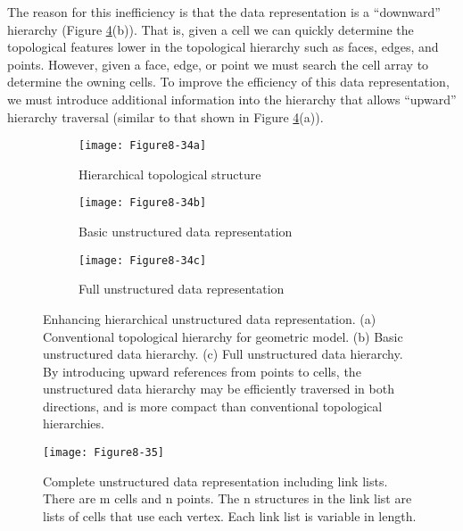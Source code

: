 The reason for this inefficiency is that the data representation is a ``downward'' hierarchy (Figure \ref{fig:Figure8-34}(b)). That is, given a cell we can quickly determine the topological features lower in the topological hierarchy such as faces, edges, and points. However, given a face, edge, or point we must search the cell array to determine the owning cells. To improve the efficiency of this data representation, we must introduce additional information into the hierarchy that allows ``upward'' hierarchy traversal (similar to that shown in Figure \ref{fig:Figure8-34}(a)).


\begin{figure}[!htb]
    \centering
    \begin{subfigure}{0.32\linewidth}
        \centering
        \texttt{[image: Figure8-34a]}
        \caption{Hierarchical topological
        structure}\label{fig:Figure8-34a}
    \end{subfigure}
    \hfill
    \begin{subfigure}{0.32\linewidth}
        \centering
        \texttt{[image: Figure8-34b]}
        \caption{Basic unstructured data representation}\label{fig:Figure8-34b}
    \end{subfigure}%
    \hfill
    \begin{subfigure}{0.32\linewidth}
        \centering
        \texttt{[image: Figure8-34c]}
        \caption{Full unstructured data representation}\label{fig:Figure8-34c}
    \end{subfigure}%
    \caption{Enhancing hierarchical unstructured data representation. (a) Conventional topological hierarchy for geometric model. (b) Basic unstructured data hierarchy. (c) Full unstructured data hierarchy. By introducing upward references from points to cells, the unstructured data hierarchy may be efficiently traversed in both directions, and is more compact than conventional topological hierarchies.}
    \label{fig:Figure8-34}
\end{figure}

\begin{figure}[!htb]
    \centering
    \texttt{[image: Figure8-35]}\\
    \caption{Complete unstructured data representation including link lists. There are m cells and n points. The n structures in the link list are lists of cells that use each vertex. Each link list is variable in length.}\label{fig:Figure8-35}
\end{figure}


